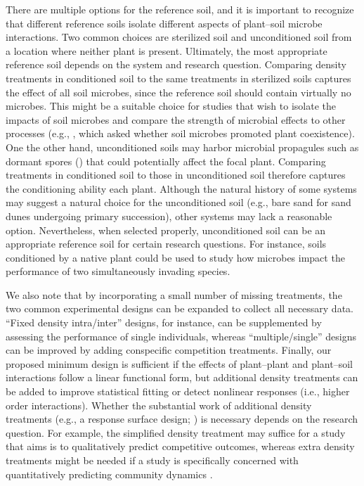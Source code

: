 There are multiple options for the reference soil, and it is important to recognize that different reference soils isolate different aspects of plant--soil microbe interactions. Two common choices are sterilized soil and unconditioned soil from a location where neither plant is present. Ultimately, the most appropriate reference soil depends on the system and research question.
Comparing density treatments in conditioned soil to the same treatments in sterilized soils captures the effect of all soil microbes, since the reference soil should contain virtually no microbes. This might be a suitable choice for studies that wish to isolate the impacts of soil microbes and compare the strength of microbial effects to other processes (e.g., \citealp{Chung2016}, which asked whether soil microbes promoted plant coexistence).
One the other hand, unconditioned soils may harbor microbial propagules such as dormant spores (\citealp{Lennon2011}) that could potentially affect the focal plant. Comparing treatments in conditioned soil to those in unconditioned soil therefore captures the conditioning ability each plant.
Although the natural history of some systems may suggest a natural choice for the unconditioned soil (e.g., bare sand for sand dunes undergoing primary succession), other systems may lack a reasonable option. Nevertheless, when selected properly, unconditioned soil can be an appropriate reference soil for certain research questions. For instance, soils conditioned by a native plant could be used to study how microbes impact the performance of two simultaneously invading species.
\par


We also note that by incorporating a small number of missing treatments, the two common experimental designs can be expanded to collect all necessary data. ``Fixed density intra/inter'' designs, for instance, can be supplemented by assessing the performance of single individuals, whereas ``multiple/single'' designs can be improved by adding conspecific competition treatments.
Finally, our proposed minimum design is sufficient if the effects of plant--plant and plant--soil interactions follow a linear functional form, but additional density treatments can be added to improve statistical fitting or detect nonlinear responses (i.e.,  higher order interactions).
Whether the substantial work of additional density treatments (e.g., a response surface design; \citealp{Inouye2001}) is necessary depends on the research question.
For example, the simplified density treatment may suffice for a study that aims is to qualitatively predict competitive outcomes, whereas extra density treatments might be needed if a study is specifically concerned with quantitatively predicting community dynamics \citep{Hart2018, Letten2019}.
\par



